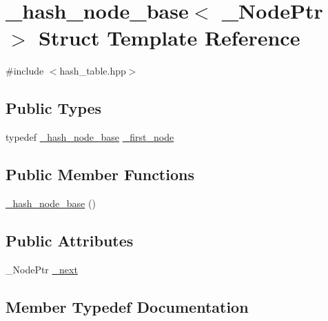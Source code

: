 \hypertarget{struct__hash__node__base}{}\section{\+\_\+hash\+\_\+node\+\_\+base$<$ \+\_\+\+Node\+Ptr $>$ Struct Template Reference}
\label{struct__hash__node__base}


{\ttfamily \#include $<$hash\+\_\+table.\+hpp$>$}

\subsection*{Public Types}
\begin{DoxyCompactItemize}
\item 
typedef \hyperlink{struct__hash__node__base}{\+\_\+hash\+\_\+node\+\_\+base} \hyperlink{struct__hash__node__base_a77d1467b3b1f892476ab62f275e27047}{\+\_\+first\+\_\+node}
\end{DoxyCompactItemize}
\subsection*{Public Member Functions}
\begin{DoxyCompactItemize}
\item 
\hyperlink{struct__hash__node__base_a6e858d0e78ef9cad930efafa35d9f233}{\+\_\+hash\+\_\+node\+\_\+base} ()
\end{DoxyCompactItemize}
\subsection*{Public Attributes}
\begin{DoxyCompactItemize}
\item 
\+\_\+\+Node\+Ptr \hyperlink{struct__hash__node__base_a2058572d4712840fbeae3489b64ab740}{\+\_\+next}
\end{DoxyCompactItemize}


\subsection{Member Typedef Documentation}
\hypertarget{struct__hash__node__base_a77d1467b3b1f892476ab62f275e27047}{}
